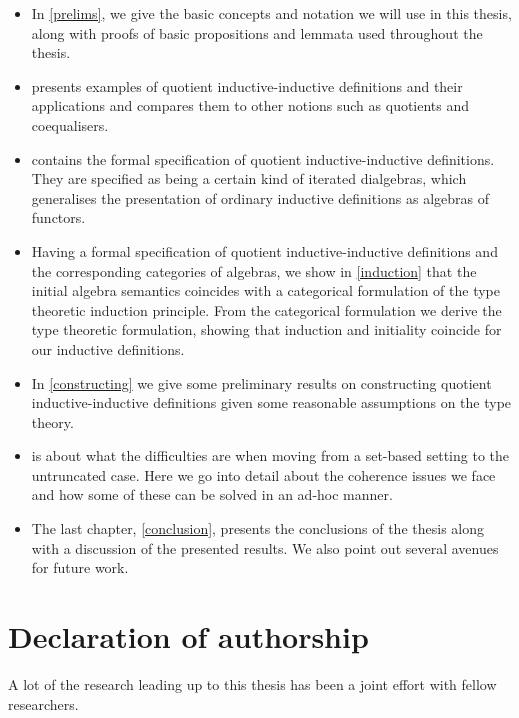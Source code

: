 \begin{itemize}
\item In \cref{prelims}, we give the basic concepts and notation we
  will use in this thesis, along with proofs of basic propositions and
  lemmata used throughout the thesis.
\item {} presents examples of quotient inductive-inductive
  definitions and their applications and compares them to other
  notions such as quotients and coequalisers.
\item {} contains the formal specification of quotient
  inductive-inductive definitions. They are specified as being a
  certain kind of iterated dialgebras, which generalises the
  presentation of ordinary inductive definitions as algebras of
  functors.
\item Having a formal specification of quotient inductive-inductive
  definitions and the corresponding categories of algebras, we show in
  \cref{induction} that the initial algebra semantics coincides with a
  categorical formulation of the type theoretic induction
  principle. From the categorical formulation we derive the type
  theoretic formulation, showing that induction and initiality
  coincide for our inductive definitions.
\item In \cref{constructing} we give some preliminary results on
  constructing quotient inductive-inductive definitions given some
  reasonable assumptions on the type theory.
\item {} is about what the difficulties are when
  moving from a set-based setting to the untruncated case. Here we go
  into detail about the coherence issues we face and how some of these
  can be solved in an ad-hoc manner.
\item The last chapter, \cref{conclusion}, presents the conclusions of
  the thesis along with a discussion of the presented results. We also
  point out several avenues for future work.
\end{itemize}

\section{Declaration of authorship}

A lot of the research leading up to this thesis has been a joint
effort with fellow researchers.

